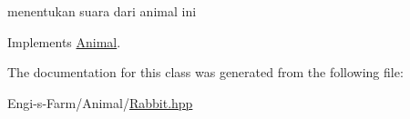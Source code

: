 menentukan suara dari animal ini 

Implements \mbox{\hyperlink{class_animal_aca8216576b21b87f761a34686a4968a8}{Animal}}.



The documentation for this class was generated from the following file\+:\begin{DoxyCompactItemize}
\item 
Engi-\/s-\/\+Farm/\+Animal/\mbox{\hyperlink{_rabbit_8hpp}{Rabbit.\+hpp}}\end{DoxyCompactItemize}
